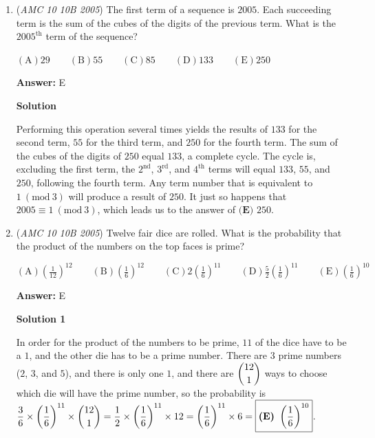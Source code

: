 \begin{enumerate}
 



\textbf{Solution 3 (Stewart's Theorem)}

Let $BD=k$. Then, by \href{https://artofproblemsolving.com/wiki/index.php?title=Stewart\%27s\_Theorem}{Stewart's Theorem}, 

 $2k(2+k)+7^2(2+k)=7^2k+8^2\cdot 2 \implies k^2+2k-15=0 \implies k=\boxed{\textbf{(A) }3}$



	\item (\textit{AMC 10 10B 2005}) The first term of a sequence is $2005$. Each succeeding term is the sum of the cubes of the digits of the previous term. What is the ${2005}^{\text{th}}$ term of the sequence?


 $\mathrm{(A)} 29 \qquad \mathrm{(B)} 55 \qquad \mathrm{(C)} 85 \qquad \mathrm{(D)} 133 \qquad \mathrm{(E)} 250$

 \textbf{Answer: }E



\textbf{Solution}

Performing this operation several times yields the results of $133$ for the second term, $55$ for the third term, and $250$ for the fourth term. The sum of the cubes of the digits of $250$ equal $133$, a complete cycle. The cycle is, excluding the first term, the $2^{\text{nd}}$, $3^{\text{rd}}$, and $4^{\text{th}}$ terms will equal $133$, $55$, and $250$, following the fourth term. Any term number that is equivalent to $1\ (\text{mod}\ 3)$ will produce a result of $250$. It just so happens that $2005\equiv 1\ (\text{mod}\ 3)$, which leads us to the answer of $\boxed{\textbf{(E) } 250}$.

 


	\item (\textit{AMC 10 10B 2005}) Twelve fair dice are rolled. What is the probability that the product of the numbers on the top faces is prime?


 $\mathrm{(A)} \left(\frac{1}{12}\right)^{12} \qquad \mathrm{(B)} \left(\frac{1}{6}\right)^{12} \qquad \mathrm{(C)} 2\left(\frac{1}{6}\right)^{11} \qquad \mathrm{(D)} \frac{5}{2}\left(\frac{1}{6}\right)^{11} \qquad \mathrm{(E)} \left(\frac{1}{6}\right)^{10}$

 \textbf{Answer: }E



\textbf{Solution 1}

In order for the product of the numbers to be prime, $11$ of the dice have to be a $1$, and the other die has to be a prime number. There are $3$ prime numbers ($2$, $3$, and $5$), and there is only one $1$, and there are $\dbinom{12}{1}$ ways to choose which die will have the prime number, so the probability is $\dfrac{3}{6}\times\left(\dfrac{1}{6}\right)^{11}\times\dbinom{12}{1} = \dfrac{1}{2}\times\left(\dfrac{1}{6}\right)^{11}\times12=\left(\dfrac{1}{6}\right)^{11}\times6=\boxed{\textbf{(E) }\left(\dfrac{1}{6}\right)^{10}}$.


\end{enumerate}
